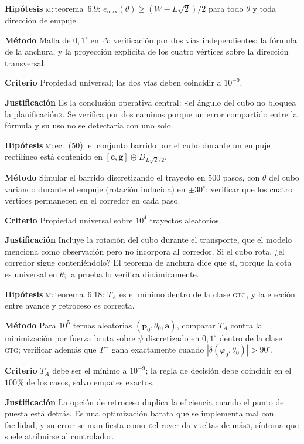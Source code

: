 \documentclass[11pt,a4paper]{article}
\newcommand{\cc}{\mathbf{c}}
\newcommand{\pp}{\mathbf{p}}
\newcommand{\gv}{\mathbf{g}}
\newcommand{\aaa}{\mathbf{a}}
\newcommand{\grados}{^{\circ}}
\newenvironment{prueba}[2]{%
  \par\medskip\noindent
  \begin{tcolorbox}[enhanced,breakable,colback=white,colframe=black!45,
    boxrule=0.5pt,arc=1pt,left=6pt,right=6pt,top=4pt,bottom=4pt,
    title={\bfseries #1\quad\normalfont #2},
    colbacktitle=black!8,coltitle=black,fonttitle=\bfseries\small]
  \small
}{\end{tcolorbox}\par\medskip}
\newcommand{\campo}[1]{\par\smallskip\noindent\textbf{#1}\quad\ignorespaces}
\begin{document}
\begin{prueba}{N3.2}{Embudo de tolerancia sobre todo el espacio de configuración}
\campo{Hipótesis} \textsc{m}:\,teorema~6.9: $e_{\max}(\theta) \ge (W-L\sqrt2)/2$ para todo
$\theta$ y toda dirección de empuje.
\campo{Método} Malla de $0{,}1\grados$ en $\Delta$; verificación por dos vías
independientes: la fórmula de la anchura, y la proyección explícita de los cuatro
vértices sobre la dirección transversal.
\campo{Criterio} Propiedad universal; las dos vías deben coincidir a $10^{-9}$.
\campo{Justificación} Es la conclusión operativa central: «el ángulo del cubo no bloquea
la planificación». Se verifica por dos caminos porque un error compartido entre la
fórmula y su uso no se detectaría con uno solo.
\end{prueba}

\begin{prueba}{N3.3}{Contención del corredor de empuje}
\campo{Hipótesis} \textsc{m}:\,ec.~(50): el conjunto barrido por el cubo durante un empuje
rectilíneo está contenido en $[\cc,\gv]\oplus D_{L\sqrt2/2}$.
\campo{Método} Simular el barrido discretizando el trayecto en $500$ pasos, con
$\theta$ del cubo variando durante el empuje (rotación inducida) en
$\pm30\grados$; verificar que los cuatro vértices permanecen en el corredor en cada
paso.
\campo{Criterio} Propiedad universal sobre $10^4$ trayectos aleatorios.
\campo{Justificación} Incluye la rotación del cubo durante el transporte, que el modelo
menciona como observación pero no incorpora al corredor. Si el cubo rota, ¿el corredor
sigue conteniéndolo? El teorema de anchura dice que sí, porque la cota es universal en
$\theta$; la prueba lo verifica dinámicamente.
\end{prueba}

\begin{prueba}{N3.4}{Funcional de costo giro--traslación--giro}
\campo{Hipótesis} \textsc{m}:\,teorema~6.18: $T_A$ es el mínimo dentro de la clase \textsc{gtg}, y la
elección entre avance y retroceso es correcta.
\campo{Método} Para $10^5$ ternas aleatorias $(\pp_0,\theta_0,\aaa)$, comparar $T_A$
contra la minimización por fuerza bruta sobre $\psi$ discretizado en $0{,}1\grados$
dentro de la clase \textsc{gtg}; verificar además que $T^-$ gana exactamente cuando
$|\delta(\varphi_0,\theta_0)| > 90\grados$.
\campo{Criterio} $T_A$ debe ser el mínimo a $10^{-9}$; la regla de decisión debe
coincidir en el $100\%$ de los casos, salvo empates exactos.
\campo{Justificación} La opción de retroceso duplica la eficiencia cuando el punto de
puesta está detrás. Es una optimización barata que se implementa mal con facilidad, y
su error se manifiesta como «el rover da vueltas de más», síntoma que suele atribuirse
al controlador.
\end{prueba}
\end{document}
